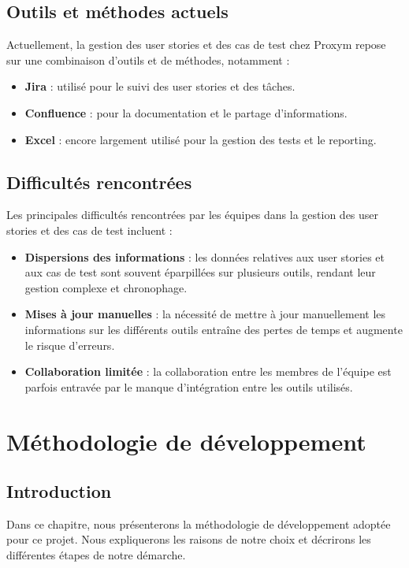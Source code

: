 \documentclass[12pt,a4paper]{report}
\begin{document}
\section{Outils et méthodes actuels}
Actuellement, la gestion des user stories et des cas de test chez Proxym repose sur une combinaison d'outils et de méthodes, notamment :
\begin{itemize}
    \item \textbf{Jira} : utilisé pour le suivi des user stories et des tâches.
    \item \textbf{Confluence} : pour la documentation et le partage d'informations.
    \item \textbf{Excel} : encore largement utilisé pour la gestion des tests et le reporting.
\end{itemize}

\section{Difficultés rencontrées}
Les principales difficultés rencontrées par les équipes dans la gestion des user stories et des cas de test incluent :
\begin{itemize}
    \item \textbf{Dispersions des informations} : les données relatives aux user stories et aux cas de test sont souvent éparpillées sur plusieurs outils, rendant leur gestion complexe et chronophage.
    \item \textbf{Mises à jour manuelles} : la nécessité de mettre à jour manuellement les informations sur les différents outils entraîne des pertes de temps et augmente le risque d'erreurs.
    \item \textbf{Collaboration limitée} : la collaboration entre les membres de l'équipe est parfois entravée par le manque d'intégration entre les outils utilisés.
\end{itemize}

\chapter{Méthodologie de développement}
\section{Introduction}
Dans ce chapitre, nous présenterons la méthodologie de développement adoptée pour ce projet. Nous expliquerons les raisons de notre choix et décrirons les différentes étapes de notre démarche.
\end{document}
